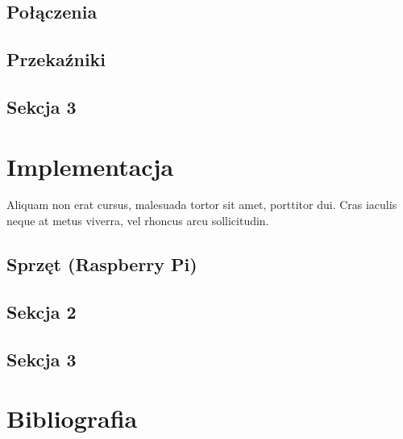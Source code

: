 \documentclass[wmii,inf,mgr]{uwmthesis}
\begin{document}
\section{Połączenia}
\section{Przekaźniki}
\section{Sekcja 3}

\chapter{Implementacja}
Aliquam non erat cursus, malesuada tortor sit amet, porttitor dui. Cras iaculis neque at metus viverra, vel rhoncus arcu sollicitudin.
\section{Sprzęt (Raspberry Pi)}
\section{Sekcja 2}
\section{Sekcja 3}

\chapter*{Bibliografia}
\end{document}
